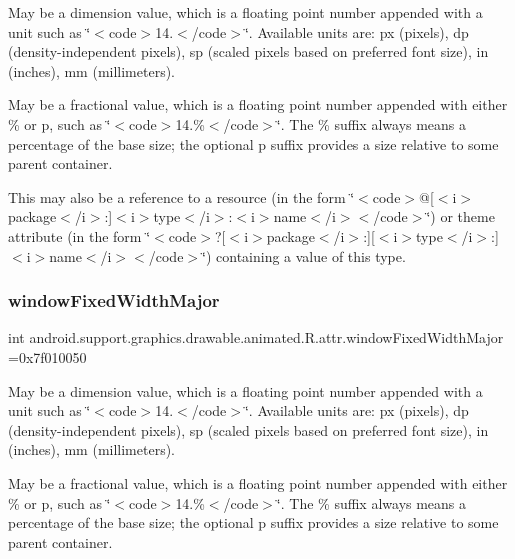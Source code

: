 May be a dimension value, which is a floating point number appended with a unit such as \char`\"{}$<$code$>$14.\+5sp$<$/code$>$\char`\"{}. Available units are\+: px (pixels), dp (density-\/independent pixels), sp (scaled pixels based on preferred font size), in (inches), mm (millimeters). 

May be a fractional value, which is a floating point number appended with either \% or p, such as \char`\"{}$<$code$>$14.\%$<$/code$>$\char`\"{}. The \% suffix always means a percentage of the base size; the optional p suffix provides a size relative to some parent container. 

This may also be a reference to a resource (in the form \char`\"{}$<$code$>$@\mbox{[}$<$i$>$package$<$/i$>$\+:\mbox{]}$<$i$>$type$<$/i$>$\+:$<$i$>$name$<$/i$>$$<$/code$>$\char`\"{}) or theme attribute (in the form \char`\"{}$<$code$>$?\mbox{[}$<$i$>$package$<$/i$>$\+:\mbox{]}\mbox{[}$<$i$>$type$<$/i$>$\+:\mbox{]}$<$i$>$name$<$/i$>$$<$/code$>$\char`\"{}) containing a value of this type. \mbox{\label{classandroid_1_1support_1_1graphics_1_1drawable_1_1animated_1_1R_1_1attr_a7f0dff1b79ada0d3e5c357c8b226a75a}} 
\subsubsection{\texorpdfstring{window\+Fixed\+Width\+Major}{windowFixedWidthMajor}}
{\footnotesize\ttfamily int android.\+support.\+graphics.\+drawable.\+animated.\+R.\+attr.\+window\+Fixed\+Width\+Major =0x7f010050\hspace{0.3cm}{\ttfamily [static]}}

May be a dimension value, which is a floating point number appended with a unit such as \char`\"{}$<$code$>$14.\+5sp$<$/code$>$\char`\"{}. Available units are\+: px (pixels), dp (density-\/independent pixels), sp (scaled pixels based on preferred font size), in (inches), mm (millimeters). 

May be a fractional value, which is a floating point number appended with either \% or p, such as \char`\"{}$<$code$>$14.\%$<$/code$>$\char`\"{}. The \% suffix always means a percentage of the base size; the optional p suffix provides a size relative to some parent container. 


